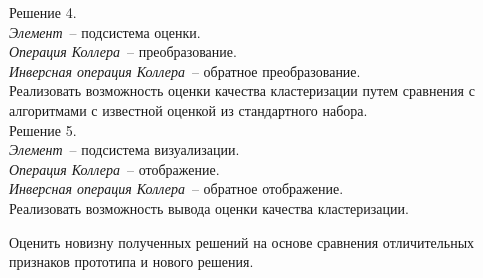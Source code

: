 Решение 4.\\
\emph{Элемент}~-- подсистема оценки.\\
\emph{Операция Коллера}~-- преобразование.\\
\emph{Инверсная операция Коллера}~-- обратное преобразование.\\
Реализовать возможность оценки качества кластеризации путем сравнения с
алгоритмами с известной оценкой из стандартного набора.\\

Решение 5.\\
\emph{Элемент}~-- подсистема визуализации.\\
\emph{Операция Коллера}~-- отображение.\\
\emph{Инверсная операция Коллера}~-- обратное отображение.\\
Реализовать возможность вывода оценки качества кластеризации.

\newpage

Оценить новизну полученных решений на основе сравнения отличительных признаков
прототипа и нового решения.

